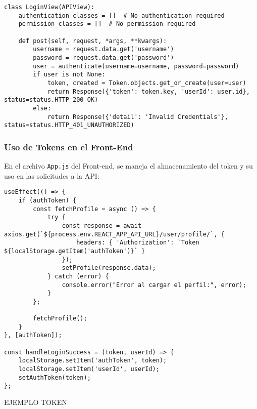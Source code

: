 \begin{verbatim}
class LoginView(APIView):
    authentication_classes = []  # No authentication required
    permission_classes = []  # No permission required

    def post(self, request, *args, **kwargs):
        username = request.data.get('username')
        password = request.data.get('password')
        user = authenticate(username=username, password=password)
        if user is not None:
            token, created = Token.objects.get_or_create(user=user)
            return Response({'token': token.key, 'userId': user.id}, status=status.HTTP_200_OK)
        else:
            return Response({'detail': 'Invalid Credentials'}, status=status.HTTP_401_UNAUTHORIZED)
\end{verbatim}

\subsubsection{Uso de Tokens en el Front-End}

En el archivo \texttt{App.js} del Front-end, se maneja el almacenamiento del token y su uso en las solicitudes a la API:

\begin{verbatim}
useEffect(() => {
    if (authToken) {
        const fetchProfile = async () => {
            try {
                const response = await axios.get(`${process.env.REACT_APP_API_URL}/user/profile/`, {
                    headers: { 'Authorization': `Token ${localStorage.getItem('authToken')}` }
                });
                setProfile(response.data);
            } catch (error) {
                console.error("Error al cargar el perfil:", error);
            }
        };

        fetchProfile();
    }
}, [authToken]);

const handleLoginSuccess = (token, userId) => {
    localStorage.setItem('authToken', token);
    localStorage.setItem('userId', userId);
    setAuthToken(token);
};
\end{verbatim}

EJEMPLO TOKEN